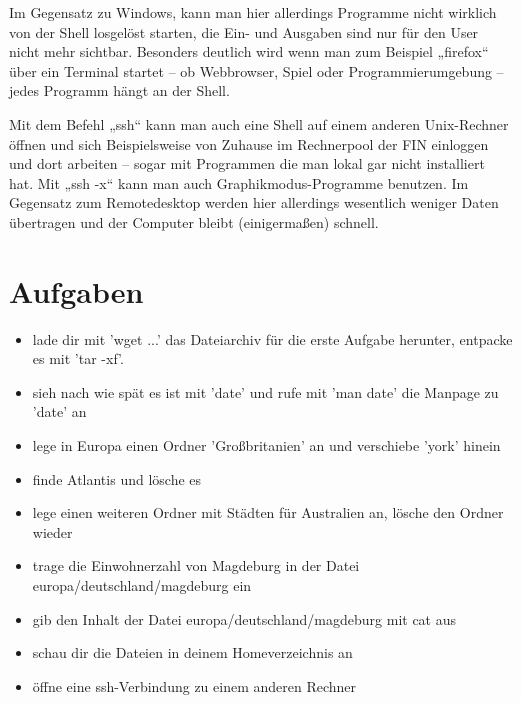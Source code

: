 Im Gegensatz zu Windows, kann man hier allerdings Programme nicht wirklich von der Shell losgelöst starten, die Ein- und Ausgaben sind nur für den User nicht mehr sichtbar. Besonders deutlich wird wenn man zum Beispiel „firefox“ über ein Terminal startet – ob Webbrowser, Spiel oder Programmierumgebung – jedes Programm hängt an der Shell.

Mit dem Befehl „ssh“ kann man auch eine Shell auf einem anderen Unix-Rechner öffnen und sich Beispielsweise von Zuhause im Rechnerpool der FIN einloggen und dort arbeiten – sogar mit Programmen die man lokal gar nicht installiert hat. Mit „ssh -x“ kann man auch Graphikmodus-Programme benutzen.
Im Gegensatz zum Remotedesktop werden hier allerdings wesentlich weniger Daten übertragen und der Computer bleibt (einigermaßen) schnell.

\section {Aufgaben}

\begin{itemize}
\item lade dir mit 'wget ...' das Dateiarchiv für die erste Aufgabe herunter, entpacke es mit 'tar -xf'.
\item sieh nach wie spät es ist mit 'date' und rufe mit 'man date' die Manpage zu 'date' an
\item lege in Europa einen Ordner 'Großbritanien' an und verschiebe 'york' hinein
\item finde Atlantis und lösche es
\item lege einen weiteren Ordner mit Städten für Australien an, lösche den Ordner wieder
\item trage die Einwohnerzahl von Magdeburg in der Datei europa/deutschland/magdeburg ein
\item gib den Inhalt der Datei europa/deutschland/magdeburg mit cat aus
\item schau dir die Dateien in deinem Homeverzeichnis an
\item öffne eine ssh-Verbindung zu einem anderen Rechner
\end{itemize}
